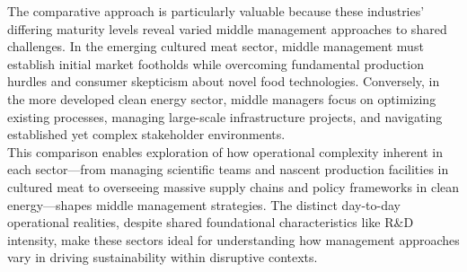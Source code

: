 	The comparative approach is particularly valuable because these industries’ differing maturity levels reveal varied middle management approaches to shared challenges. In the emerging cultured meat sector, middle management must establish initial market footholds while overcoming fundamental production hurdles and consumer skepticism about novel food technologies. Conversely, in the more developed clean energy sector, middle managers focus on optimizing existing processes, managing large-scale infrastructure projects, and navigating established yet complex stakeholder environments. \\
	
	This comparison enables exploration of how operational complexity inherent in each sector—from managing scientific teams and nascent production facilities in cultured meat to overseeing massive supply chains and policy frameworks in clean energy—shapes middle management strategies. The distinct day-to-day operational realities, despite shared foundational characteristics like R\&D intensity, make these sectors ideal for understanding how management approaches vary in driving sustainability within disruptive contexts. \\
	
